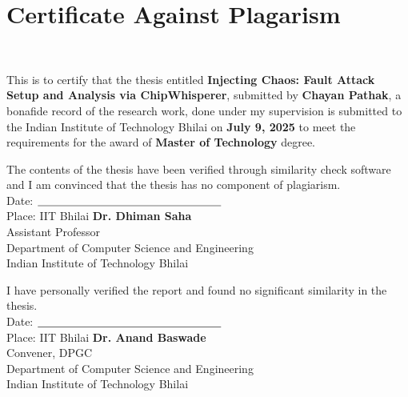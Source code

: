 \chapter[Approval]{Certificate Against Plagarism}

\hspace{0pt plus 1filll} \\
  
 \begin{Spacing}{1}
 	\sffamily
 	
\noindent 	
This is to certify that the thesis entitled \textbf{Injecting Chaos: Fault Attack Setup and Analysis via ChipWhisperer}, submitted by \textbf{Chayan Pathak}, a bonafide record of the research work, done under my supervision is submitted to the Indian Institute of Technology Bhilai on {\bfseries July 9, 2025} to meet the requirements for the award of {\bfseries Master of Technology} degree.

The contents of the thesis have been verified through similarity check software and I am convinced that the thesis has no component of plagiarism.\\

\vspace{3em}
\noindent
Date: \hspace{0pt plus 1filll} $\underline{\hspace{5.8cm}}$\\
Place: IIT Bhilai \hspace{0pt plus 1filll} \textbf{Dr. Dhiman Saha}\\
\hspace*{0pt plus 1filll} Assistant Professor\\
\hspace*{0pt plus 1filll} Department of Computer Science and Engineering\\
\hspace*{0pt plus 1filll} Indian Institute of Technology Bhilai



\vspace{4em}
I have personally verified the report and found no significant similarity in the thesis.\\

\vspace{3em}
\noindent
Date: \hspace{0pt plus 1filll} $\underline{\hspace{5.8cm}}$\\
Place: IIT Bhilai \hspace{0pt plus 1filll} \textbf{Dr. Anand Baswade}\\
\hspace*{0pt plus 1filll} Convener, DPGC\\
\hspace*{0pt plus 1filll} Department of Computer Science and Engineering\\
\hspace*{0pt plus 1filll} Indian Institute of Technology Bhilai

\end{Spacing}